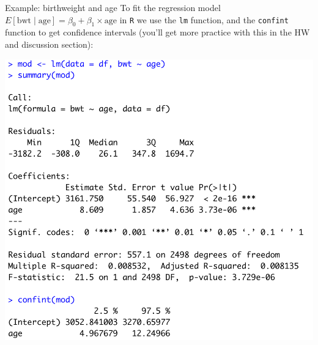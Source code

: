 \documentclass[10pt,t]{beamer}
\begin{document}
\begin{frame}{Example: birthweight and age}
To fit the regression model $E[\text{bwt} \mid \text{age}] = \beta_0 + \beta_1 \times \text{age}$ in \texttt{R} we use the \texttt{lm} function, and the \texttt{confint} function to get confidence intervals (you'll get more practice with this in the HW and discussion section):

\vspace{0.15cm}

\centering \includegraphics[scale=0.35]{lm_bwt_age.png}

\end{frame}
\end{document}

